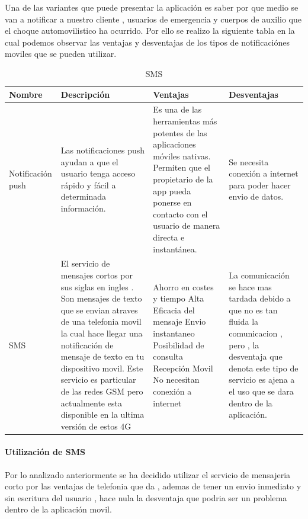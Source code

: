 Una de las variantes que puede presentar la aplicación es saber por que medio se van a notificar a nuestro cliente , usuarios de emergencia y cuerpos de auxilio que el choque automovilistico ha ocurrido. Por ello se realizo la siguiente tabla en la cual podemos observar las ventajas y desventajas de los tipos de notificaciónes moviles que se pueden utilizar.\\


\begin{table}[h!]
\begin{tabular}{|p{2cm}|p{4cm}|p{4cm}|p{4cm}|}
\hline
\textbf{Nombre}& \textbf{Descripción}&\textbf{Ventajas}& \textbf{Desventajas}\\
\hline
\hline
Notificación push & Las notificaciones push ayudan a que el usuario tenga acceso rápido y fácil a determinada información. & Es una de las herramientas más potentes de las aplicaciones móviles nativas. Permiten que el propietario de la app pueda ponerse en contacto con el usuario de manera directa e instantánea.& Se necesita conexión a internet para poder hacer envio de datos.\\
\hline
\hline
SMS & El servicio de mensajes cortos por sus siglas en ingles . Son mensajes de texto que se envian atraves de una telefonia movil la cual hace llegar una notificación de mensaje de texto en tu dispositivo movil. Este servicio es particular de las redes GSM pero actualmente esta disponible en la ultima versión de estos 4G & \begin{UClist}
		\UCli Ahorro en costes y tiempo
		\UCli Alta Eficacia del mensaje
		\UCli Envio instantaneo
		\UCli Posibilidad de consulta
		\UCli Recepción Movil
		\UCli No necesitan conexión a internet
\end{UClist} & La comunicación se hace mas tardada debido a que no es tan fluida la comunicacion , pero , la desventaja que denota  este tipo de servicio es ajena a el uso que se dara dentro de la aplicación. \\
\hline
\end{tabular}
\caption{SMS}
\label{disenoEstructura:SMS}
\end{table}
\paragraph{Utilización de SMS}
\begin{UClist}
\UCli Por lo analizado anteriormente se ha decidido utilizar el servicio de mensajeria corto por las ventajas de telefonia que da , ademas de tener un envio inmediato y sin escritura del usuario , hace nula la desventaja que podria ser un problema dentro de la aplicación movil.
\end{UClist}

